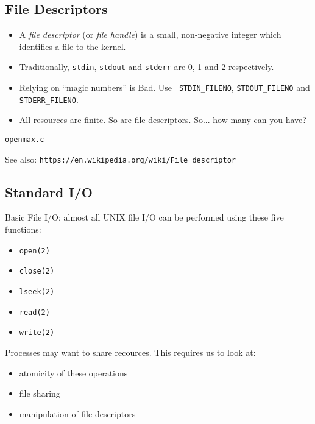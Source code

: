 \documentclass[xga]{xdvislides}
\begin{document}
\subsection{File Descriptors}
\begin{itemize}
	\item A {\em file descriptor} (or {\em file handle}) is a small,
		non-negative integer which identifies a file to the kernel.
	\item Traditionally, {\tt stdin}, {\tt stdout} and {\tt stderr}
		are 0, 1 and 2 respectively.
	\item Relying on ``magic numbers'' is Bad\texttrademark.  Use {\tt
		STDIN\_FILENO}, {\tt STDOUT\_FILENO} and {\tt STDERR\_FILENO}.
	\item All resources are finite.  So are file descriptors.  So... how many can you have?
\end{itemize}

\addvspace{.5in}
\begin{center}
\Huge
\verb+openmax.c+
\normalsize
\end{center}

\vspace*{\fill}
See also: \verb+https://en.wikipedia.org/wiki/File_descriptor+

\subsection{Standard I/O}
Basic File I/O: almost all UNIX file I/O can be
performed using these five functions:
\begin{itemize}
	\item {\tt open(2)}
	\item {\tt close(2)}
	\item {\tt lseek(2)}
	\item {\tt read(2)}
	\item {\tt write(2)}
\end{itemize}
\vspace{.25in}
Processes may want to share recources.  This requires us to look at:
\begin{itemize}
	\item atomicity of these operations
	\item file sharing
	\item manipulation of file descriptors
\end{itemize}
\end{document}
